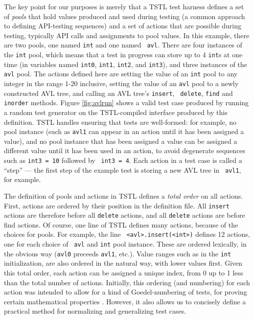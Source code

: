 The key point for our purposes is merely that a TSTL test harness
defines a set of \emph{pools} that hold values produced and used
during testing \cite{AndrewsTR} (a common approach to defining
API-testing sequences) and a set of actions that are possible during
testing, typically API calls and assignments to pool values.  In this
example, there are two pools, one named {\tt int} and one named {\tt
  avl}.  There are four instances of the {\tt int} pool, which means
that a test in progress can store up to 4 {\tt int}s at one time (in
variables named {\tt int0}, {\tt int1}, {\tt int2}, and {\tt int3}), and three
instances of the {\tt avl} pool.  The actions defined here are setting
the value of an {\tt int} pool to any integer in the range 1-20
inclusive, setting the value of an {\tt avl} pool to a newly
constructed AVL tree, and calling an AVL tree's {\tt insert}, {\tt
  delete}, {\tt find} and {\tt inorder} methods.  Figure \ref{fig:avlrun}
shows a valid test case produced by running a random test generator on
the TSTL-compiled interface produced by this definition.  TSTL handles
ensuring that tests are well-formed: for example, no pool instance
(such as {\tt avl1} can appear in an action until it has been assigned
a value), and no pool instance that has been assigned a value can be
assigned a different value until it has been used in an action, to
avoid degenerate sequences such as {\tt int3 = 10} followed by {\tt
  int3 = 4}.  Each action in a test case is called a ``step'' --- the
first step of the example test is storing a new AVL tree in {\tt
  avl1}, for example.

The definition of pools and actions in TSTL defines a \emph{total
  order} on all actions.  First, actions are ordered by their position
in the definition file.  All {\tt insert} actions are therefore before
all {\tt delete} actions, and all {\tt delete} actions are before find
actions.  Of course, one line of TSTL defines many actions, because of
the choices for pools.  For example, the line {\tt
  <avl>.insert(<int>)} defines 12 actions, one for each choice of {\tt
  avl} and {\tt int} pool instance.  These are ordered lexically, in
the obvious way ({\tt avl0} preceeds {\tt avl1}, etc.).  Value ranges
such as in the {\tt int} initialization, are also ordered in the
natural way, with lower values first.  Given this total order, each
action can be assigned a unique index, from 0 up to 1 less than the
total number of actions. Initially, this ordering (and
numbering) for each action was intended to allow for a kind of
Goedel-numbering of tests, for proving certain mathematical properties
\cite{AndrewsTR}.  However, it also allows us to concisely define a
practical method for normalizing and generalizing test cases.



